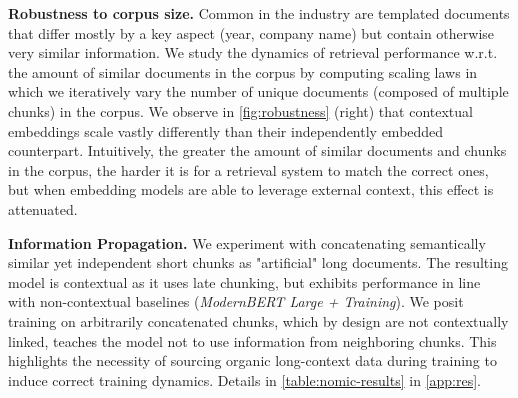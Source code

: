 \noindent\textbf{Robustness to corpus size.}
Common in the industry are templated documents that differ mostly by a key aspect (year, company name) but contain otherwise very similar information.
We study the dynamics of retrieval performance w.r.t. the amount of similar documents in the corpus by computing scaling laws in which we iteratively vary the number of unique documents (composed of multiple chunks) in the corpus.
We observe in \autoref{fig:robustness} (right) that contextual embeddings scale vastly differently than their independently embedded counterpart. 
Intuitively, the greater the amount of similar documents and chunks in the corpus, the harder it is for a retrieval system to match the correct ones, but when embedding models are able to leverage external context, this effect is attenuated.



\noindent\textbf{Information Propagation.}
We experiment with concatenating semantically similar yet independent short chunks as "artificial" long documents. The resulting model is contextual as it uses late chunking, but exhibits performance in line with non-contextual baselines (\textit{ModernBERT Large + Training}). We posit training on arbitrarily concatenated chunks, which by design are not contextually linked, teaches the model not to use information from neighboring chunks. This highlights the necessity of sourcing organic long-context data during training to induce correct training dynamics. Details in \autoref{table:nomic-results} in \autoref{app:res}.






